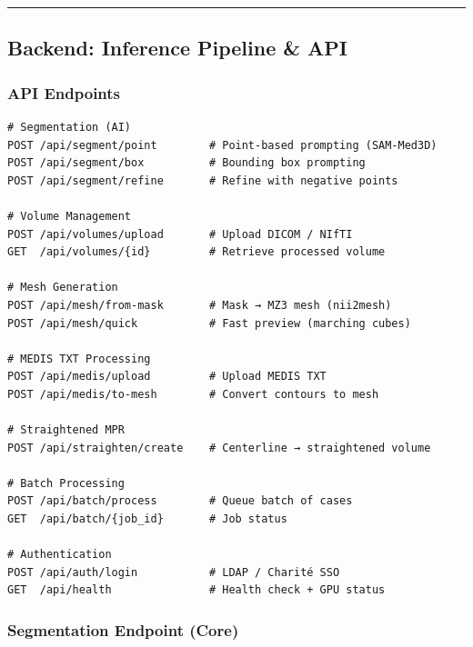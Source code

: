 \documentclass[
  11pt,
]{article}
\begin{document}
\begin{center}\rule{0.5\linewidth}{0.5pt}\end{center}

\subsection{Backend: Inference Pipeline \&
API}\label{backend-inference-pipeline-api}

\subsubsection{API Endpoints}\label{api-endpoints}

\begin{verbatim}
# Segmentation (AI)
POST /api/segment/point        # Point-based prompting (SAM-Med3D)
POST /api/segment/box          # Bounding box prompting
POST /api/segment/refine       # Refine with negative points

# Volume Management
POST /api/volumes/upload       # Upload DICOM / NIfTI
GET  /api/volumes/{id}         # Retrieve processed volume

# Mesh Generation
POST /api/mesh/from-mask       # Mask → MZ3 mesh (nii2mesh)
POST /api/mesh/quick           # Fast preview (marching cubes)

# MEDIS TXT Processing
POST /api/medis/upload         # Upload MEDIS TXT
POST /api/medis/to-mesh        # Convert contours to mesh

# Straightened MPR
POST /api/straighten/create    # Centerline → straightened volume

# Batch Processing
POST /api/batch/process        # Queue batch of cases
GET  /api/batch/{job_id}       # Job status

# Authentication
POST /api/auth/login           # LDAP / Charité SSO
GET  /api/health               # Health check + GPU status
\end{verbatim}

\subsubsection{Segmentation Endpoint
(Core)}\label{segmentation-endpoint-core}
\end{document}
